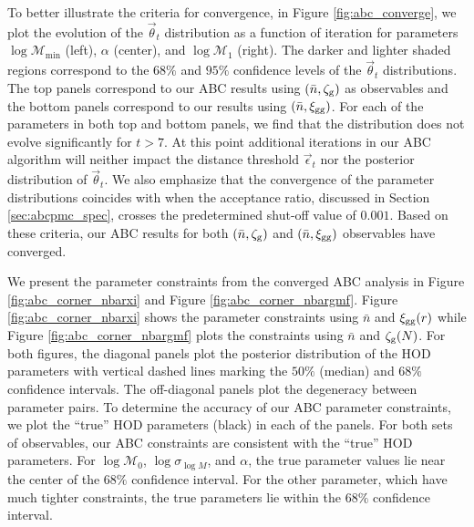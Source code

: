 \documentclass[fleqn,usenatbib]{mnras}
\newcommand{\pars}{\vec{\theta}}
\begin{document}
To better illustrate the criteria for convergence, in Figure \ref{fig:abc_converge}, 
we plot the evolution of the $\pars_t$ distribution as a function of iteration 
for parameters $\log\mathcal{M}_\mathrm{min}$ (left), $\alpha$ (center), and 
$\log\mathcal{M}_1$ (right). The darker and lighter shaded regions correspond to the 
$68\%$ and $95\%$ confidence levels of the $\pars_t$ distributions. The top panels 
correspond to our ABC results using $(\bar{n}, \mathcal{\zeta}_{\rm g})$ as observables and the bottom 
panels correspond to our results using $(\bar{n}, \xi_{\mathrm{gg}})$. 
For each of the parameters in both top and bottom panels, we find that the distribution 
does not evolve significantly for $t > 7$. At this point additional iterations in
our ABC algorithm will neither impact the distance threshold $\vec\epsilon_t$ nor 
the posterior distribution of $\pars_t$. We also emphasize that the convergence of the 
parameter distributions coincides with when the acceptance ratio, discussed in Section 
\ref{sec:abcpmc_spec}, crosses the predetermined shut-off value of $0.001$. Based on these criteria, 
our ABC results for both $(\bar{n}, \mathcal{\zeta}_{\rm g})$ and $(\bar{n}, \xi_{\mathrm{gg}})$ observables have converged. 

We present the parameter constraints from the converged ABC analysis in Figure \ref{fig:abc_corner_nbarxi} and 
Figure \ref{fig:abc_corner_nbargmf}. Figure \ref{fig:abc_corner_nbarxi} shows 
the parameter constraints using $\bar{n}$ and $\xi_{\mathrm{gg}}(r)$ while Figure 
\ref{fig:abc_corner_nbargmf} plots the constraints using $\bar{n}$ and $\mathcal{\zeta}_{\rm g}(N)$.
For both figures, the diagonal panels plot the posterior distribution of the 
HOD parameters with vertical dashed lines marking the $50\%$ (median) and $68\%$ 
confidence intervals. The off-diagonal panels plot the degeneracy between  
parameter pairs. To determine the accuracy of our ABC parameter constraints, we plot
the ``true'' HOD parameters (black) in each of the panels.
For both sets of observables, our ABC constraints are consistent with the 
``true'' HOD parameters. For $\log\mathcal{M}_0$, $\log\sigma_{\log M}$,
and $\alpha$, the true parameter values lie near the center of the $68\%$ confidence 
interval. For the other parameter, which have much tighter constraints, the true 
parameters lie within the $68\%$ confidence interval.  
\end{document}
